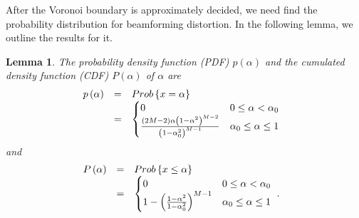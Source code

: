 \documentclass[a4paper,10pt,fleqn, twocolumn]{IEEEtran}
\newtheorem{lemma}{Lemma}
\begin{document}
\noindent After the Voronoi boundary is approximately decided, we
need find the probability distribution for beamforming distortion.
In the following lemma, we outline the results for it.

\begin{lemma} The probability density function (PDF) $p\left(\alpha\right)$ and the cumulated density function (CDF) $P\left(\alpha\right)$ of
$\alpha$ are
\begin{equation}\hspace{-0.10in}
\begin{array}{rcl}
p\left(\alpha\right)&=&\mbox{Prob}\left\{x=\alpha\right\}\\
&=&\begin{cases}
0 & 0\leq \alpha < \alpha_{0} \\
\frac{\left(2M-2\right)\alpha\left(1-\alpha^2\right)^{M-2}}{\left(1-\alpha_{0}^{2}\right)^{M-1}}
& \alpha_{0}\leq\alpha\leq 1
\end{cases}
\end{array}
\end{equation}
\noindent and
\begin{equation}\hspace{-0.10in}
\begin{array}{rcl}
P\left(\alpha\right)&=&\mbox{Prob}\left\{x\leq\alpha\right\} \\
&=&
\begin{cases}
0 & 0 \leq\alpha < \alpha_{0} \\
1-\left(\frac{1-\alpha^2}{1-\alpha_{0}^2}\right)^{M-1} &
\alpha_{0}\leq\alpha\leq 1
\end{cases}\ .
\end{array}
\end{equation}
\end{lemma}
\end{document}
